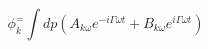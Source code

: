\begin{equation}
\phi_k^=\int dp (A_{k\omega }e^{-i\Gamma\omega t}+ B_{k\omega
}e^{i\Gamma \omega t})
\end{equation}

